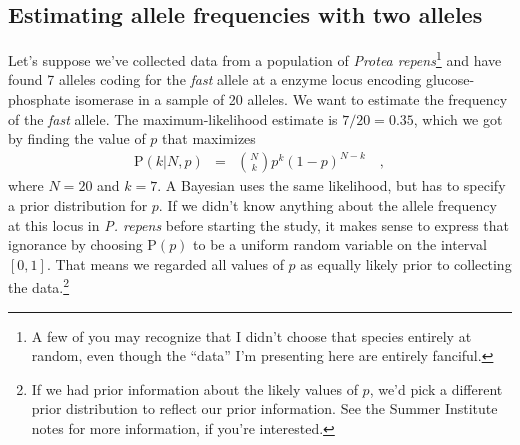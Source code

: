 \subsection*{Estimating allele frequencies with two alleles}

Let's suppose we've collected data from a population of {\it Protea
  repens}\footnote{A few of you may recognize that I didn't choose
  that species entirely at random, even though the ``data'' I'm
  presenting here are entirely fanciful.} and have found 7 alleles
coding for the {\it fast\/} allele at a enzyme locus encoding
glucose-phosphate isomerase in a sample of 20 alleles. We want to
estimate the frequency of the {\it fast\/} allele. The
maximum-likelihood estimate is $7/20 = 0.35$, which we got by finding
the value of $p$ that maximizes
\begin{eqnarray*}
\mbox{P}(k|N,p) &=& {N \choose k} p^k (1-p)^{N-k} \quad ,
\end{eqnarray*}
where $N=20$ and $k=7$. A Bayesian uses the same likelihood, but has
to specify a prior distribution for $p$. If we didn't know anything
about the allele frequency at this locus in {\it P. repens} before
starting the study, it makes sense to express that ignorance by
choosing $\mbox{P}(p)$ to be a uniform random variable on the interval
$[0,1]$. That means we regarded all values of $p$ as equally likely
prior to collecting the data.\footnote{If we had prior information
  about the likely values of $p$, we'd pick a different prior
  distribution to reflect our prior information. See the Summer
  Institute notes for more information, if you're interested.}

